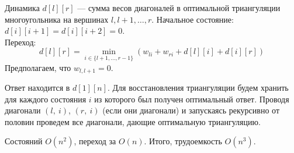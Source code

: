 \documentclass[10pt]{article}
\begin{document}
\begin{enumerate}
Динамика $d[l][r]$ --- сумма весов диагоналей в оптимальной триангуляции многоугольника на вершинах $l, l+1, \ldots, r$. Начальное состояние: $d[i][i+1] = d[i][i+2] = 0$.\\
Переход:
$$d[l][r] = \min_{i \in \{l+1, \ldots, r-1\}} (w_{li} + w_{ri} + d[l][i] + d[i][r])$$
Предполагаем, что $w_{l, l+1} = 0$.

Ответ находится в $d[1][n]$. Для восстановления триангуляции будем хранить для каждого состояния $i$ из которого был получен оптимальный ответ. Проводя диагонали $(l,\ i)$, $(r,\ i)$ (если они диагонали) и запускаясь рекурсивно от половин проведем все диагонали, дающие оптимальную триангуляцию.

Состояний $O(n^2)$, переход за $O(n)$. Итого, трудоемкость $O(n^3)$.
\end{enumerate}
\end{document}
